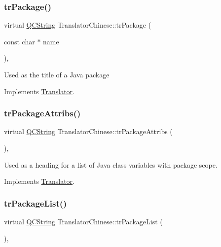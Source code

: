 \subsubsection{\texorpdfstring{trPackage()}{trPackage()}}
{\footnotesize\ttfamily virtual \mbox{\hyperlink{class_q_c_string}{Q\+C\+String}} Translator\+Chinese\+::tr\+Package (\begin{DoxyParamCaption}\item[{const char $\ast$}]{name }\end{DoxyParamCaption})\hspace{0.3cm}{\ttfamily [inline]}, {\ttfamily [virtual]}}

Used as the title of a Java package 

Implements \mbox{\hyperlink{class_translator}{Translator}}.

\mbox{\label{class_translator_chinese_a50804b5ad74925daac9ddeda1ae7a10c}} 
\subsubsection{\texorpdfstring{trPackageAttribs()}{trPackageAttribs()}}
{\footnotesize\ttfamily virtual \mbox{\hyperlink{class_q_c_string}{Q\+C\+String}} Translator\+Chinese\+::tr\+Package\+Attribs (\begin{DoxyParamCaption}{ }\end{DoxyParamCaption})\hspace{0.3cm}{\ttfamily [inline]}, {\ttfamily [virtual]}}

Used as a heading for a list of Java class variables with package scope. 

Implements \mbox{\hyperlink{class_translator}{Translator}}.

\mbox{\label{class_translator_chinese_a1d59869229bf4e9dab9ae80bcbaddb69}} 
\subsubsection{\texorpdfstring{trPackageList()}{trPackageList()}}
{\footnotesize\ttfamily virtual \mbox{\hyperlink{class_q_c_string}{Q\+C\+String}} Translator\+Chinese\+::tr\+Package\+List (\begin{DoxyParamCaption}{ }\end{DoxyParamCaption})\hspace{0.3cm}{\ttfamily [inline]}, {\ttfamily [virtual]}}

